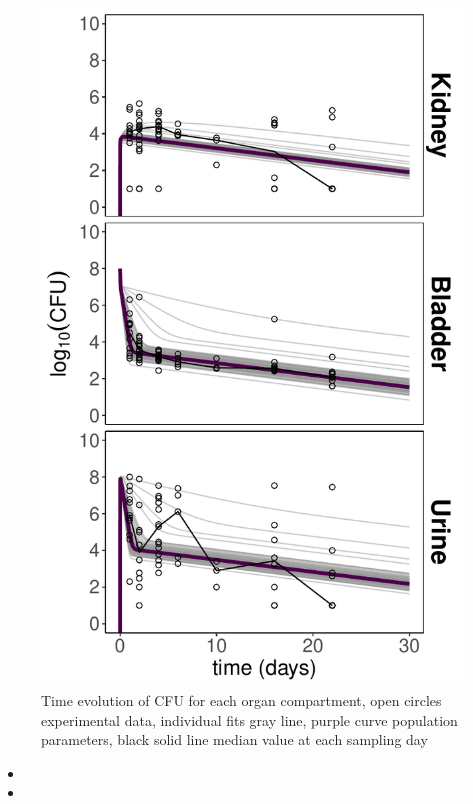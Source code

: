 \documentclass{article}
\begin{document}
\begin{figure}
	\centering
	\includegraphics[width=\linewidth]{images/plt_final_model_Ct_PAS_vertical.pdf}
	\caption{Time evolution of CFU for each organ compartment, open circles experimental data, individual fits gray line, purple curve population parameters, black solid line median value at each sampling day}
	\label{fig:ModelIndFits}
\end{figure}


\begin{itemize}
	\item {}
	\item {}
\end{itemize}
\end{document}
